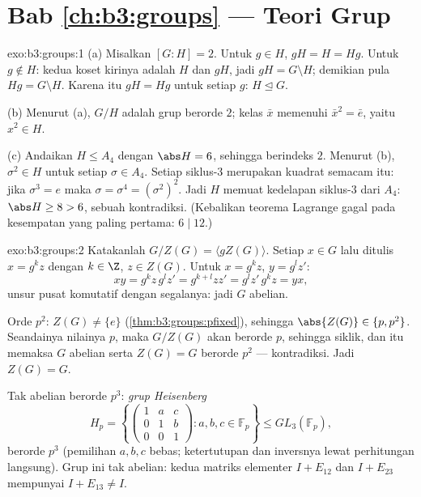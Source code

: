 \section*{Bab \ref{ch:b3:groups} --- Teori Grup}

\begin{solution}{exo:b3:groups:1}
(a) Misalkan $[G:H] = 2$. Untuk $g \in H$, $gH = H = Hg$. Untuk $g \notin
H$: kedua koset kirinya adalah $H$ dan $gH$, jadi $gH = G \setminus H$;
demikian pula $Hg = G \setminus H$. Karena itu $gH = Hg$ untuk setiap $g$: $H
\trianglelefteq G$.

(b) Menurut (a), $G/H$ adalah grup berorde $2$; kelas $\bar x$
memenuhi $\bar x^2 = \bar e$, yaitu $x^2 \in H$.

(c) Andaikan $H \leq A_4$ dengan $\abs H = 6$, sehingga berindeks $2$. Menurut
(b), $\sigma^2 \in H$ untuk setiap $\sigma \in A_4$. Setiap siklus-$3$
merupakan kuadrat semacam itu: jika $\sigma^3 = e$ maka $\sigma =
\sigma^4 = (\sigma^2)^2$. Jadi $H$ memuat kedelapan siklus-$3$ dari
$A_4$: $\abs H \geq 8 > 6$, sebuah kontradiksi. (Kebalikan teorema Lagrange
gagal pada kesempatan yang paling pertama: $6 \mid 12$.)
\end{solution}

\begin{solution}{exo:b3:groups:2}
Katakanlah $G/Z(G) = \langle gZ(G) \rangle$. Setiap $x \in G$ lalu ditulis
$x = g^k z$ dengan $k \in \Z$, $z \in Z(G)$. Untuk $x = g^kz$, $y =
g^l z'$:
\[
xy = g^k z\, g^l z' = g^{k+l} z z' = g^l z'\, g^k z = yx,
\]
unsur pusat komutatif dengan segalanya: jadi $G$ abelian.

Orde $p^2$: $Z(G) \neq \{e\}$ (\cref{thm:b3:groups:pfixed}), sehingga
$\abs{Z(G)} \in \{p, p^2\}$. Seandainya nilainya $p$, maka $G/Z(G)$ akan
berorde $p$, sehingga siklik, dan itu memaksa $G$ abelian serta $Z(G) =
G$ berorde $p^2$ --- kontradiksi. Jadi $Z(G) = G$.

Tak abelian berorde $p^3$: \emph{grup Heisenberg}
\[
H_p = \left\{ \begin{pmatrix} 1 & a & c\\ 0 & 1 & b\\ 0 & 0 & 1
\end{pmatrix} : a, b, c \in \mathbb F_p \right\}
\leq GL_3(\mathbb F_p),
\]
berorde $p^3$ (pemilihan $a, b, c$ bebas; ketertutupan dan inversnya lewat
perhitungan langsung). Grup ini tak abelian: kedua matriks elementer
$I + E_{12}$ dan $I + E_{23}$ mempunyai  $I + E_{13} \neq I$.
\end{solution}

